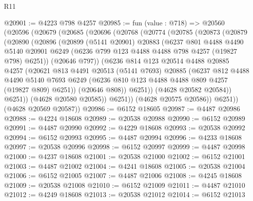 \begin{lexlean}{R11}
\begin{coremodule}
@20901 := @4223 @798 @4257
@20985 := fun (value : @718) =>
  @20560
    (@20596
      (@20679
        (@20685
          (@20696
            (@20768
              (@20774
                (@20785
                  (@20873
                    (@20879
                      (@20890
                        (@20896
                          (@20899
                            (@5141 @20901)
                            @20883
                            (@6237
                              @801
                              @4488
                              @4490
                              @5140
                              @20901
                              @6249
                              (@6236 @799 @123 @4488 @4488 @798 @4257 (@19827 @798) @6251))
                            (@20646 @797))
                          (@6236
                            @814
                            @123
                            @20514
                            @4488
                            @20885
                            @4257
                            (@20621
                              @813
                              @4491
                              @20513
                              (@5141 @7693)
                              @20885
                              (@6237
                                @812
                                @4488
                                @4490
                                @5140
                                @7693
                                @6249
                                (@6236 @810 @123 @4488 @4488 @809 @4257 (@19827 @809) @6251))
                              (@20646 @808))
                            @6251))
                        (@4628 @20582 @20584))
                      @6251))
                  (@4628 @20580 @20585))
                @6251))
            (@4628 @20575 @20586))
          @6251))
      (@4628 @20569 @20587))
@20986 := @6152 @18605
@20987 := @4487 @20986
@20988 := @4224 @18608
@20989 := @20538 @20988
@20990 := @6152 @20989
@20991 := @4487 @20990
@20992 := @4229 @18608
@20993 := @20538 @20992
@20994 := @6152 @20993
@20995 := @4487 @20994
@20996 := @4233 @18608
@20997 := @20538 @20996
@20998 := @6152 @20997
@20999 := @4487 @20998
@21000 := @4237 @18608
@21001 := @20538 @21000
@21002 := @6152 @21001
@21003 := @4487 @21002
@21004 := @4241 @18608
@21005 := @20538 @21004
@21006 := @6152 @21005
@21007 := @4487 @21006
@21008 := @4245 @18608
@21009 := @20538 @21008
@21010 := @6152 @21009
@21011 := @4487 @21010
@21012 := @4249 @18608
@21013 := @20538 @21012
@21014 := @6152 @21013

\end{coremodule}
\end{lexlean}
